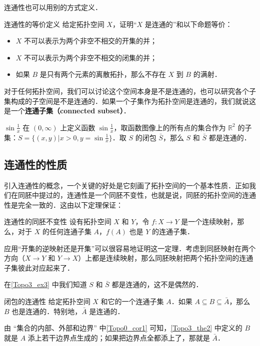 连通性也可以用别的方式定义．

\begin{exercise}{连通性的等价定义}\label{Topo3_exe1}
给定拓扑空间 $X$，证明“$X$ 是连通的”和以下命题等价：
\begin{itemize}
\item $X$ 不可以表示为两个非空不相交的开集的并；
\item $X$ 不可以表示为两个非空不相交的闭集的并；
\item 如果 $B$ 是只有两个元素的离散拓扑，那么不存在 $X$ 到 $B$ 的满射．

\end{itemize}
\end{exercise}

对于任何拓扑空间，我们可以讨论这个空间本身是不是连通的，也可以研究各个子集构成的子空间是不是连通的．如果一个子集作为拓扑空间是连通的，我们就说这是一个\textbf{连通子集（connected subset）}．

\begin{example}{$\sin{\frac{1}{x}}$}\label{Topo3_ex3}
在 $(0,\infty)$ 上定义函数 $\sin{\frac{1}{x}}$，取函数图像上的所有点的集合作为 $\mathbb{R}^2$ 的子集：$S=\{(x, y)|x>0, y=\sin{\frac{1}{x}}\}$．取 $S$ 的闭包 $\bar{S}$，那么 $S$ 和 $\bar{S}$ 都是连通的．
\end{example}

\subsection{连通性的性质}

引入连通性的概念，一个关键的好处是它刻画了拓扑空间的一个基本性质．正如我们在同胚中提过的，连通性是一个同胚不变性，也就是说，同胚的拓扑空间的连通性是完全一致的．这由以下定理保证：

\begin{theorem}{连通性的同胚不变性}\label{Topo3_the1}
设有拓扑空间 $X$ 和 $Y$，令 $f:X\rightarrow Y$ 是一个连续映射，那么，对于 $X$ 的任何连通子集 $A$，$f(A)$ 也是 $Y$ 的连通子集．
\end{theorem}

应用“开集的逆映射还是开集”可以很容易地证明这一定理．考虑到同胚映射在两个方向（$X\rightarrow Y$ 和 $Y\rightarrow X$）上都是连续映射，那么同胚映射把两个拓扑空间的连通子集彼此对应起来了．

在\autoref{Topo3_ex3} 中我们知道 $S$ 和 $\bar{S}$ 都是连通的，这不是偶然的．

\begin{theorem}{闭包的连通性}\label{Topo3_the2}
给定拓扑空间 $X$ 和它的一个连通子集 $A$．如果 $A\subseteq B\subseteq\bar{A}$，那么 $B$ 也是连通的．特别地，$\bar{A}$ 是连通的．
\end{theorem}

由 “集合的内部、外部和边界” 中\autoref{Topo0_cor1} 可知，\autoref{Topo3_the2} 中定义的 $B$ 就是 $A$ 添上若干边界点生成的；如果把边界点全都添上了，那就是 $\bar{A}$．